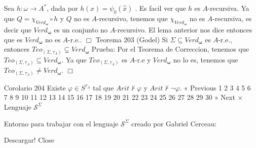 Sea \(h:\omega \rightarrow A^{\ast }\), dada por \(h(x)=\psi _{0}(\widehat{x})\) . Es facil ver que \(h\) es \(A\)-recursiva. Ya que \(Q=\chi _{Verd_{\mathbf{ \omega }}}\circ h\) y \(Q\) no es \(A\)-recursivo, tenemos que \(\chi _{Verd_{ \mathbf{\omega }}}\) no es \(A\)-recursiva, es decir que \(Verd_{\mathbf{\omega } }\) es un conjunto no \(A\)-recursivo. El lema anterior nos dice entonces que es \(Verd_{\mathbf{\omega }}\) no es \(A\)-r.e.. \(\Box\)
Teorema 203 (Godel) Si \(\Sigma \subseteq Verd_{\mathbf{\omega }}\) es \(A\)-r.e., entonces \( Teo_{(\Sigma ,\tau _{A})}\subsetneq Verd_{\mathbf{\omega }}\)
Prueba: Por el Teorema de Correccion, tenemos que \(Teo_{(\Sigma ,\tau _{A})}\subseteq Verd_{\mathbf{\omega }}\). Ya que \(Teo_{(\Sigma ,\tau _{A})}\) es \(A\)-r.e y \(Verd_{\mathbf{\omega }}\) no lo es, tenemos que \(Teo_{(\Sigma ,\tau _{A})}\neq Verd_{\mathbf{\omega }}\). \(\Box\)

Corolario 204 Existe \(\varphi \in S^{\tau _{A}}\) tal que \(Arit\nvdash \varphi \) y \( Arit\nvdash \lnot \varphi \).
« Previous
1
2
3
4
5
6
7
8
9
10
11
12
13
14
15
16
17
18
19
20
21
22
23
24
25
26
27
28
29
30
» Next
×
Lenguaje \(\mathcal{S}^{\Sigma }\)

Entorno para trabajar con el lenguaje \(\mathcal{S}^{\Sigma }\) creado por Gabriel Cerceau:

Descargar!
Close
